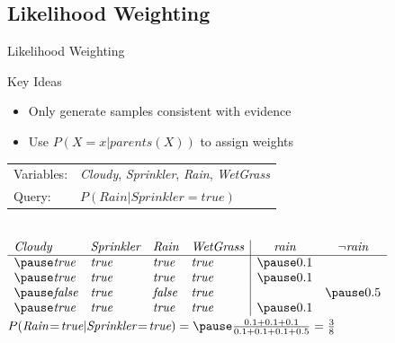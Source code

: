 \documentclass[14pt]{beamer}
\begin{document}
\subsection{Likelihood Weighting}
\begin{frame}{Likelihood Weighting}
	\begin{block}{Key Ideas}
		\begin{itemize}
			\item Only generate samples consistent with evidence
			\item Use $P(X\!=\!x|\textit{parents}(X))$ to assign weights
		\end{itemize}
	\end{block}
	\medskip
	\pause
	\begin{tabular}{ll}
		Variables: & \textit{Cloudy}, \textit{Sprinkler}, \textit{Rain}, \textit{WetGrass} \\
		Query:     & $P(\textit{Rain}|\textit{Sprinkler}\!=\!\textit{true})$
	\end{tabular}
	\\
	\smallskip
	$
	\begin{array}{llll|cc}
		\textit{Cloudy} & \textit{Sprinkler} & \textit{Rain}  & \textit{WetGrass} & \textit{rain}  & \lnot\textit{rain} \\
		\hline
		\pause
		\textit{true}   & \textit{true}      & \textit{true}  & \textit{true}     & \pause 0.1 &                \\
		\pause
		\textit{true}   & \textit{true}      & \textit{true}  & \textit{true}     & \pause 0.1 &                \\
		\pause
		\textit{false}  & \textit{true}      & \textit{false} & \textit{true}     &            & \pause 0.5     \\
		\pause
		\textit{true}   & \textit{true}      & \textit{true}  & \textit{true}     & \pause 0.1 &                \\
	\end{array}
	$
	\\
	\smallskip
	\pause
	\tab$P(\textit{Rain}\!=\!\textit{true}|\textit{Sprinkler}\!=\!\textit{true})=\pause\frac{0.1 + 0.1 + 0.1}{0.1 + 0.1 + 0.1 + 0.5} = \frac{3}{8}$
\end{frame}
\end{document}

